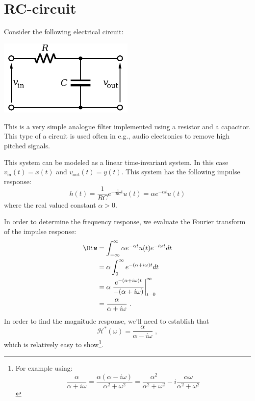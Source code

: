 \newpage
\section{RC-circuit}
Consider the following electrical circuit:
\begin{center}
\includegraphics[width=0.5\textwidth]{Applications/figures/rc.pdf}
\end{center}
This is a very simple analogue filter implemented using a resistor and
a capacitor. This type of a circuit is used often in e.g., audio
electronics to remove high pitched signals.

This system can be modeled as a linear time-invariant system. In this
case $v_{\mathrm{in}}(t) = x(t)$ and $v_{\mathrm{out}}(t) =
y(t)$. This system has the following impulse response:
\begin{equation}
h(t) = \frac{1}{RC} e^{-\frac{1}{RC}t}u(t) = \alpha e^{-\alpha t} u(t)
\end{equation}
where the real valued constant $\alpha > 0$. 

In order to determine the frequency response, we evaluate the Fourier 
transform of the impulse response:
\begin{align}
\Hiw &= \int_{-\infty}^{\infty} \alpha e^{-\alpha t} u(t) e^{-i\omega t}dt \\
     &= \alpha \int_{0}^{\infty} e^{-(\alpha+i\omega) t} dt \\
     &= \alpha \left. \frac{e^{-(\alpha+i\omega)t}}{-(\alpha+i\omega)}\right\rvert_{t=0}^{\infty} \\
     &= \frac{\alpha}{\alpha + i\omega}\,\,.
\end{align}
In order to find the magnitude response, we'll need to establish that
\begin{equation}
  \mathcal{H}^*(\omega) = \frac{\alpha}{\alpha - i\omega}\,\,,
\end{equation}
which is relatively easy to show\footnote{For example using: \begin{equation*}\frac{\alpha}{\alpha + i \omega} = \frac{\alpha(\alpha - i\omega)}{\alpha^2 + \omega^2} = \frac{\alpha^2}{\alpha^2 + \omega^2} - i\frac{\alpha\omega}{\alpha^2 + \omega^2}\end{equation*}}.

